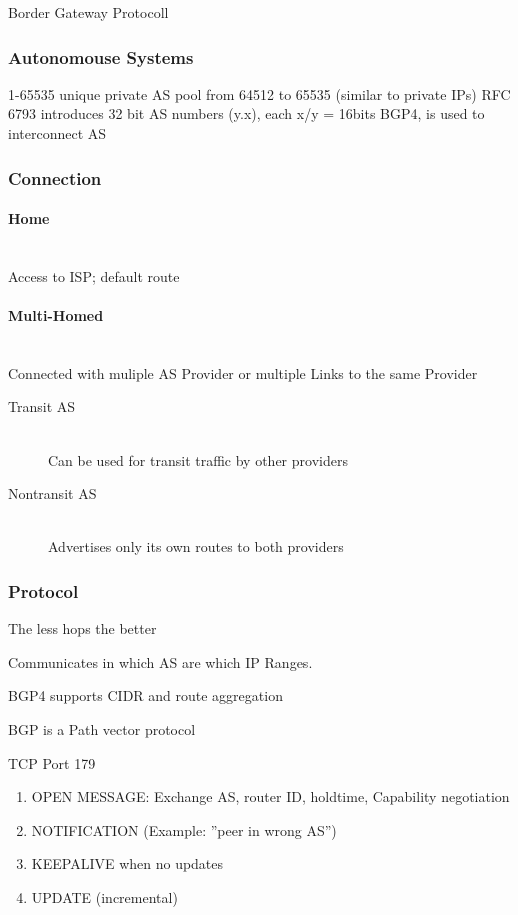 Border Gateway Protocoll

\subsubsection{Autonomouse Systems}

1-65535 unique
private AS pool from 64512 to 65535 (similar to private IPs)
RFC 6793 introduces 32 bit AS numbers
(y.x), each x/y = 16bits
BGP4, is used to interconnect AS

\subsubsection{Connection}

\paragraph{Home} \hfill \\

Access to ISP; default route

\paragraph{Multi-Homed} \hfill \\
Connected with muliple AS Provider or multiple Links to the same Provider

\begin{description}
	\item[Transit AS] \hfill \\
	Can be used for transit traffic by other providers
	\item[Nontransit AS] \hfill \\
	Advertises only its own routes to both providers
\end{description}

\subsubsection{Protocol}

The less hops the better

Communicates in which AS are which IP Ranges.

BGP4 supports CIDR and route aggregation

BGP is a Path vector protocol

TCP Port 179

\begin{enumerate}
	\item OPEN MESSAGE: Exchange AS, router ID, holdtime, Capability negotiation
	\item NOTIFICATION (Example: ''peer in wrong AS'')
	\item KEEPALIVE when no updates
	\item UPDATE (incremental)
\end{enumerate}



